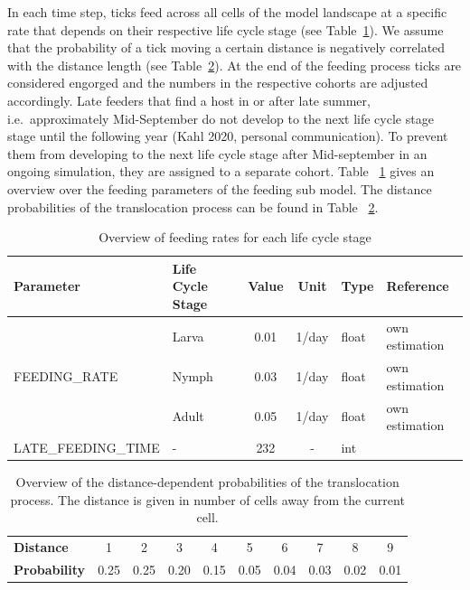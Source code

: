 \documentclass[a4paper, 11pt]{scrartcl}
\begin{document}
In each time step, ticks feed across all cells of the model landscape at a specific rate that depends on their respective life cycle stage (see Table~\ref{tab:feeding_parameters}). We assume that the probability of a tick moving a certain distance is negatively correlated with the distance length (see Table~\ref{tab:distance_probabilities}). At the end of the feeding process ticks are considered engorged and the numbers in the respective cohorts are adjusted accordingly. Late feeders that find a host in or after late summer, i.e.\ approximately Mid-September do not develop to the next life cycle stage stage until the following year (Kahl 2020, personal communication). To prevent them from developing to the next life cycle stage after Mid-september in an ongoing simulation, they are assigned to a separate cohort. Table ~\ref{tab:feeding_parameters} gives an overview over the feeding parameters of the feeding sub model. The distance probabilities of the translocation process can be found in Table ~\ref{tab:distance_probabilities}.

\begin{table}[h!]
\caption[Overview of feeding rates for each life cycle stage]{Overview of feeding rates for each life cycle stage}
\label{tab:feeding_parameters}
\begin{tabularx}{\textwidth}{llccll}
\toprule
\textbf{Parameter} & \textbf{Life Cycle Stage} & \textbf{Value} & \textbf{Unit} & \textbf{Type}	& \textbf{Reference} \\
\midrule
\multirow{3}{*}{\tiny{FEEDING\_RATE}} & Larva	& 0.01	& 1/day & float	 & own estimation \\
									  & Nymph	& 0.03	& 1/day & float	 & own estimation \\
									  & Adult	& 0.05	& 1/day & float	 & own estimation \\
\tiny{LATE\_FEEDING\_TIME}			  & - & 232 & -	& int	 & \cite{tba} \\
\bottomrule
\end{tabularx}
\end{table}

\begin{table}[h!]
\centering
\caption[Overview of distance-dependent probabilities of the translocation process]{Overview of the distance-dependent probabilities of the translocation process. The distance is given in number of cells away from the current cell.}
\label{tab:distance_probabilities}
\begin{tabularx}{\textwidth}{lccccccccc}
\toprule
\textbf{Distance} & 1 & 2 & 3 & 4 & 5 & 6 & 7 & 8 & 9 \\
\textbf{Probability} & 0.25 & 0.25 & 0.20 & 0.15 & 0.05 & 0.04 & 0.03 & 0.02 & 0.01 \\
\bottomrule
\end{tabularx}
\end{table}
\end{document}
